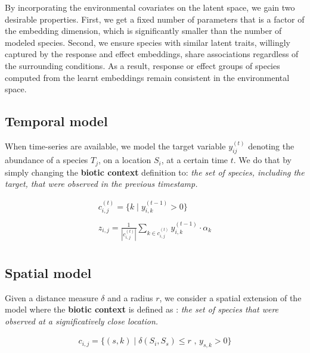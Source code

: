 \documentclass[]{article}
\begin{document}
By incorporating the environmental covariates on the latent space, we gain two desirable properties. First, we get a fixed number of parameters that is a factor of the embedding dimension, which is significantly smaller than the number of modeled species. Second, we ensure species with similar latent traits, willingly captured by the response and effect embeddings, share associations regardless of the surrounding conditions. As a result, response or effect groups of species computed from the learnt embeddings remain consistent in the environmental space. 

\subsection{Temporal model}
When time-series are available, we model the target variable $y_{ij}^{(t)}$ denoting the abundance of a species $T_j$, on a location $S_i$, at a certain time $t$. We do that by simply changing the \textbf{biotic context} definition to: \textit{the set of species, including the target, that were observed in the previous timestamp.}

\begin{equation*}
\begin{matrix}
c_{i,j}^{(t)} = \{k  \mid y_{i,k}^{(t-1)}>0 \} \\\\ 
z_{i,j} = \frac{1}{|c_{i,j}^{(t)}|}\sum_{k \in c_{i,j}^{(t)}} y_{i,k}^{(t-1)} \cdot \alpha_{k}\\
\end{matrix}
\end{equation*}

\subsection{Spatial model}
Given a distance measure $\delta$ and a radius $r$, we consider a spatial extension of the model where the \textbf{biotic context} is defined as : \textit{the set of species that were observed at a significatively close location.}

\begin{equation*}
\begin{matrix}
c_{i,j} = \{(s,k)  \mid \delta(S_i,S_s)\leq r \text{ , } y_{s,k}>0 \} \\\\ 
\end{matrix}
\end{equation*}
\end{document}

